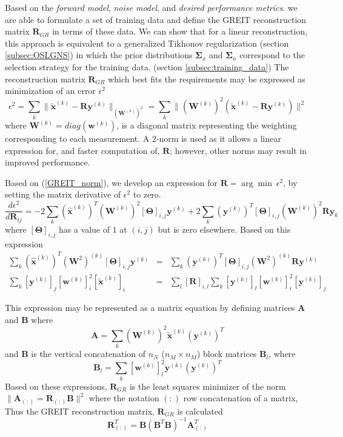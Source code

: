 \documentclass[12pt]{iopart}
\newcommand{\xH}{\mbox{$\mathbf{\hat x}$}}
\newcommand{\xT}{\mbox{$\mathbf{\tilde x}$}}
\newcommand{\yB}{\mbox{$\mathbf{y}$}}
\newcommand{\wB}{\mbox{$\mathbf{w}$}}
\newcommand{\AB}{\mbox{$\mathbf{A}$}}
\newcommand{\BB}{\mbox{$\mathbf{B}$}}
\newcommand{\RB}{\mbox{$\mathbf{R}$}}
\newcommand{\WB}{\mbox{$\mathbf{W}$}}
\newcommand{\SG}{\mbox{${\boldsymbol \Sigma}$}}
\newcommand{\TG}{\mbox{${\boldsymbol \Theta}$}}
\begin{document}
Based on the {\em forward model}, {\em noise model},
and {\em desired performance metrics}. we are
able to formulate a set of training data and
define the GREIT reconstruction matrix $\RB_{GR}$
in terms of these data. We can show that
for a linear reconstruction, this approach is 
equivalent to a generalized Tikhonov regularization
(section \ref{subsec:OSLGNS})
in which the prior distributions $\SG_x$ and $\SG_n$
correspond to the selection strategy for
the training data.
(section \ref{subsec:training_data})
The
reconstruction matrix $\RB_{GR}$ which best fits the requirements
may be expressed as minimization of an error $\epsilon^2$
\begin{equation}
\label{GREIT_norm}
\epsilon^2 = \sum_k \| \xT^{(k)} - \RB \yB^{(k)} \|_{(\WB^{(k)})^2}
    = \sum_k \| (\WB^{(k)})^2 (\xT^{(k)} - \RB \yB^{(k)} ) \|^2
\end{equation}
where $\WB^{(k)} = diag( \wB^{(k)})$, is a diagonal matrix representing
the weighting corresponding to each measurement. A 2-norm is used as it allows
a linear expression for, and faster computation of, $\RB$;
however, other norms may result in improved performance.

Based on (\ref{GREIT_norm}), we develop an expression
for $\RB = \arg\min~\epsilon^2$, by setting the
matrix derivative of $\epsilon^2$ to zero.
\begin{equation}
\frac{ d\epsilon^2 }{ d\RB_{ij} } =
-2 \sum_k (\xH^{(k)})^T (\WB^{(k)})^2 [\TG]_{i,j} \yB^{(k)}
+2 \sum_k (\yB^{(k)})^T [\TG]_{i,j} (\WB^{(k)})^2 \RB \yB_k
\end{equation}
where $[\TG]_{i,j}$ has a value of $1$ at $(i,j)$
but is zero elsewhere. Based on this expression
\begin{eqnarray}
  \sum_k (\xH^{(k)})^T (\WB^2)^{(k)} [\TG]_{i,j} \yB^{(k)}
 &=&
  \sum_k (\yB^{(k)})^T [\TG]_{i,j} (\WB^2)^{(k)} \RB \yB^{(k)}
\nonumber
\\
  \sum_k [\yB^{(k)}]_j [\wB^{(k)}]_i^2 [\xT^{(k)}]_i 
 &=&
  \sum_l [\RB]_{i,l} \sum_k [\yB^{(k)}]_l [\wB^{(k)}]_i^2 [\yB^{(k)}]_j 
\end{eqnarray}

This expression may be represented as a matrix equation
by defining matrices $\AB$ and $\BB$ where
\begin{equation}
\AB = \sum_k (\WB^{(k)})^2 \xT^{(k)} (\yB^{(k)})^T 
\end{equation}
and $\BB$ is the vertical concatenation of $n_N$
($n_M \times n_M$) block matrices $\BB_l$, where
\begin{equation}
\BB_l = \sum_k [\wB^{(k)}]_l^2 \yB^{(k)} (\yB^{(k)})^T 
\end{equation}
Based on these expressions, $\RB_{GR}$ is the
least squares minimizer of the norm 
$\|\AB_{(:)} = \RB_{(:)} \BB\|^2$ where
the notation $(:)$ row concatenation of a matrix,
Thus the GREIT reconstruction matrix, $\RB_{GR}$
is calculated
\begin{equation}
\RB_{(:)}^T = \BB (\BB^T \BB)^{-1} \AB_{(:)}^T
\end{equation}
\end{document}
